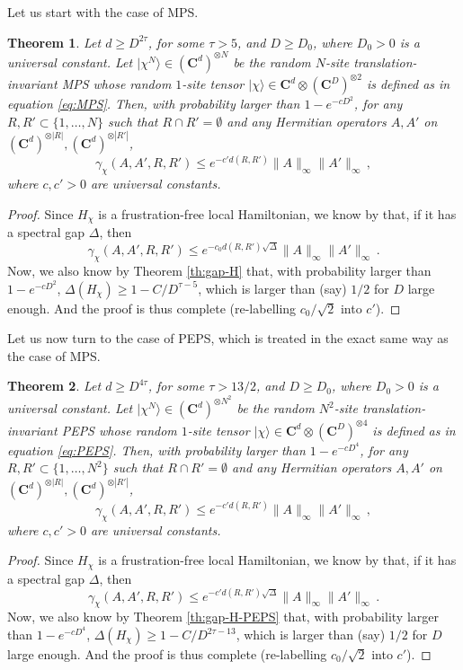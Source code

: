 \documentclass{amsart}
\newtheorem{theorem}{Theorem}[section]
\newcommand{\C}{\mathbf{C}}
\renewcommand{\leq}{\leqslant}
\renewcommand{\geq}{\geqslant}
\newcommand{\ket}[1]{| #1 \rangle}
\begin{document}
Let us start with the case of MPS.

\begin{theorem} \label{th:dc1-MPS}
    Let $d\geq D^{2\tau}$, for some $\tau>5$, and $D\geq D_0$, where $D_0>0$ is a universal constant. Let $\ket{\chi^{N}}\in(\C^d)^{\otimes N}$ be the random $N$-site translation-invariant MPS whose random $1$-site tensor $\ket{\chi}\in\C^d\otimes(\C^D)^{\otimes 2}$ is defined as in equation \eqref{eq:MPS}. Then, with probability larger than $1-e^{-cD^2}$, for any $R,R'\subset\{1,\ldots,N\}$ such that $R\cap R'=\emptyset$ and any Hermitian operators $A,A'$ on $(\C^d)^{\otimes |R|},(\C^d)^{\otimes |R'|}$,
    \[ \gamma_{\chi}(A,A',R,R') \leq e^{-c'd(R,R')}\|A\|_{\infty}\|A'\|_{\infty} \, , \]
    where $c,c'>0$ are universal constants.
\end{theorem}

\begin{proof}
    Since $H_{\chi}$ is a frustration-free local Hamiltonian, we know by \cite[Theorem 1]{GH} that, if it has a spectral gap $\Delta$, then
    \[ \gamma_{\chi}(A,A',R,R') \leq e^{-c_0d(R,R')\sqrt{\Delta}}\|A\|_{\infty}\|A'\|_{\infty} \, . \]
    Now, we also know by Theorem \ref{th:gap-H} that, with probability larger than $1-e^{-cD^2}$, $\Delta(H_{\chi})\geq 1-C/D^{\tau-5}$, which is larger than (say) $1/2$ for $D$ large enough. And the proof is thus complete (re-labelling $c_0/\sqrt{2}$ into $c'$).
\end{proof}

Let us now turn to the case of PEPS, which is treated in the exact same way as the case of MPS.

\begin{theorem} \label{th:dc1-PEPS}
    Let $d\geq D^{4\tau}$, for some $\tau>13/2$, and $D\geq D_0$, where $D_0>0$ is a universal constant. Let $\ket{\chi^N}\in(\C^d)^{\otimes N^2}$ be the random $N^2$-site translation-invariant PEPS whose random $1$-site tensor $\ket{\chi}\in\C^d\otimes(\C^D)^{\otimes 4}$ is defined as in equation \eqref{eq:PEPS}. Then, with probability larger than $1-e^{-cD^4}$, for any $R,R'\subset\{1,\ldots,N^2\}$ such that $R\cap R'=\emptyset$ and any Hermitian operators $A,A'$ on $(\C^d)^{\otimes |R|},(\C^d)^{\otimes |R'|}$,
    \[ \gamma_{\chi}(A,A',R,R') \leq e^{-c'd(R,R')}\|A\|_{\infty}\|A'\|_{\infty} \, , \]
    where $c,c'>0$ are universal constants.
\end{theorem}

\begin{proof}
    Since $H_{\chi}$ is a frustration-free local Hamiltonian, we know by \cite[Theorem 1]{GH} that, if it has a spectral gap $\Delta$, then
    \[ \gamma_{\chi}(A,A',R,R') \leq e^{-c'd(R,R')\sqrt{\Delta}}\|A\|_{\infty}\|A'\|_{\infty} \, . \]
    Now, we also know by Theorem \ref{th:gap-H-PEPS} that, with probability larger than $1-e^{-cD^4}$, $\Delta(H_{\chi})\geq 1-C/D^{2\tau-13}$, which is larger than (say) $1/2$ for $D$ large enough. And the proof is thus complete (re-labelling $c_0/\sqrt{2}$ into $c'$).
\end{proof}
\end{document}
